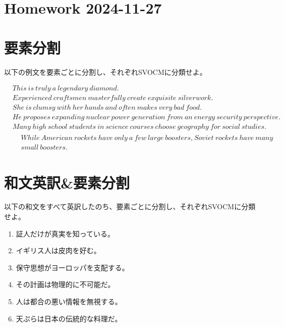 \documentclass[12pt,a4paper,titlepage]{jsarticle}
\title{}
\author{}
\date{\today}
\begin{document}
\setlength\lineskiplimit{30pt}
\setlength\lineskip{30pt}

\section*{Homework 2024-11-27}

\section{要素分割}

以下の例文を要素ごとに分割し、それぞれSVOCMに分類せよ。

\begin{align}
  &This ~ is ~ truly ~ a ~ legendary ~ diamond \text{.}\\
  &Experienced ~ craftsmen ~ masterfully ~ create ~ exquisite ~ silverwork \text{.}\\
  &She ~ is ~ clumsy ~ with ~ her ~ hands ~ and ~ often ~ makes ~ very ~ bad ~ food \text{.}\\
  &He ~ proposes ~ expanding ~ nuclear ~ power ~ generation ~ from ~ an ~ energy ~ security ~ perspective \text{.}\\
  &Many ~ high ~ school ~ students ~ in ~ science ~ courses ~ choose ~ geography ~ for ~ social ~ studies \text{.}\\
  &
  \begin{aligned}
    &While ~ American ~ rockets ~ have ~ only ~ a ~ few ~ large ~ boosters\text{,} ~
    Soviet ~ rockets ~ have ~ many\\ &small ~ boosters\text{.}
  \end{aligned}
\end{align}

\newpage

\section{和文英訳\&要素分割}

以下の和文をすべて英訳したのち、要素ごとに分割し、それぞれSVOCMに分類せよ。

\begin{enumerate}
  \item 証人だけが真実を知っている。\\
  \item イギリス人は皮肉を好む。\\
  \item 保守思想がヨーロッパを支配する。\\
  \item その計画は物理的に不可能だ。\\
  \item 人は都合の悪い情報を無視する。\\
  \item 天ぷらは日本の伝統的な料理だ。
\end{enumerate}
\end{document}

